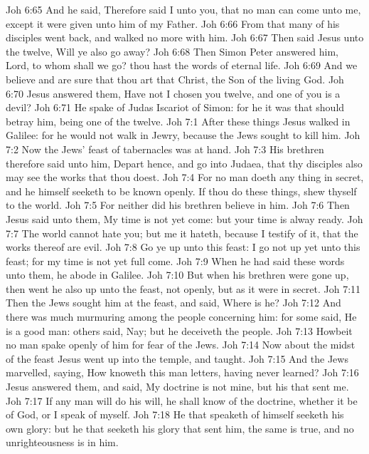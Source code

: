 \vs Joh 6:65 And he said, Therefore said I unto you, that no man can come unto me, except it were given unto him of my Father.
\vs Joh 6:66 From that  many of his disciples went back, and walked no more with him.
\vs Joh 6:67 Then said Jesus unto the twelve, Will ye also go away?
\vs Joh 6:68 Then Simon Peter answered him, Lord, to whom shall we go? thou hast the words of eternal life.
\vs Joh 6:69 And we believe and are sure that thou art that Christ, the Son of the living God.
\vs Joh 6:70 Jesus answered them, Have not I chosen you twelve, and one of you is a devil?
\vs Joh 6:71 He spake of Judas Iscariot  of Simon: for he it was that should betray him, being one of the twelve.
\vs Joh 7:1 After these things Jesus walked in Galilee: for he would not walk in Jewry, because the Jews sought to kill him.
\vs Joh 7:2 Now the Jews' feast of tabernacles was at hand.
\vs Joh 7:3 His brethren therefore said unto him, Depart hence, and go into Judaea, that thy disciples also may see the works that thou doest.
\vs Joh 7:4 For  no man  doeth any thing in secret, and he himself seeketh to be known openly. If thou do these things, shew thyself to the world.
\vs Joh 7:5 For neither did his brethren believe in him.
\vs Joh 7:6 Then Jesus said unto them, My time is not yet come: but your time is alway ready.
\vs Joh 7:7 The world cannot hate you; but me it hateth, because I testify of it, that the works thereof are evil.
\vs Joh 7:8 Go ye up unto this feast: I go not up yet unto this feast; for my time is not yet full come.
\vs Joh 7:9 When he had said these words unto them, he abode  in Galilee.
\vs Joh 7:10 But when his brethren were gone up, then went he also up unto the feast, not openly, but as it were in secret.
\vs Joh 7:11 Then the Jews sought him at the feast, and said, Where is he?
\vs Joh 7:12 And there was much murmuring among the people concerning him: for some said, He is a good man: others said, Nay; but he deceiveth the people.
\vs Joh 7:13 Howbeit no man spake openly of him for fear of the Jews.
\vs Joh 7:14 Now about the midst of the feast Jesus went up into the temple, and taught.
\vs Joh 7:15 And the Jews marvelled, saying, How knoweth this man letters, having never learned?
\vs Joh 7:16 Jesus answered them, and said, My doctrine is not mine, but his that sent me.
\vs Joh 7:17 If any man will do his will, he shall know of the doctrine, whether it be of God, or  I speak of myself.
\vs Joh 7:18 He that speaketh of himself seeketh his own glory: but he that seeketh his glory that sent him, the same is true, and no unrighteousness is in him.
